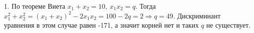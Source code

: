 1. По теореме Виета $x_1+x_2=10,\ x_1x_2=q.$ Тогда $x_1^2+x_2^2=(x_1+x_2)^2-2x_1x_2=100-2q=2\Rightarrow q=49.$ Дискриминант уравнения в этом случае равен -171, а значит корней нет и таких $q$ не существует.\\
